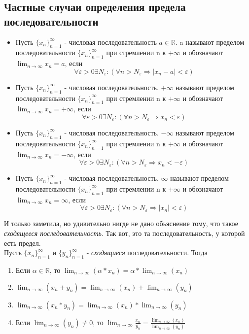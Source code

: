 \documentclass[10pt, a4paper,twocolumn]{article}
\begin{document}
\subsection{Частные случаи определения предела последовательности}
\begin{itemize}
    \item Пусть $\{x_{n}\}^{\infty}_{n = 1}$ - числовая последовательность $a \in \mathbb{R}$. a называют пределом последовательности $\{x_{n}\}^{\infty}_{n = 1}$ при стремлении n к $+ \infty$ и обозначают $\lim_{n \to \infty} x_{n} = a$, если $$\forall \varepsilon > 0 \exists N_{\varepsilon} : (\forall n > N_{\varepsilon} \Rightarrow |x_n - a| < \varepsilon)$$
    \item Пусть $\{x_{n}\}^{\infty}_{n = 1}$ - числовая последовательность. $+ \infty$ называют пределом последовательности $\{x_{n}\}^{\infty}_{n = 1}$ при стремлении n к $+ \infty$ и обозначают $\lim_{n \to \infty} x_{n} = +\infty$, если $$\forall \varepsilon > 0 \exists N_{\varepsilon} : (\forall n > N_{\varepsilon} \Rightarrow x_n < \varepsilon)$$
    \item Пусть $\{x_{n}\}^{\infty}_{n = 1}$ - числовая последовательность. $- \infty$ называют пределом последовательности $\{x_{n}\}^{\infty}_{n = 1}$ при стремлении n к $+ \infty$ и обозначают $\lim_{n \to \infty} x_{n} = -\infty$, если $$\forall \varepsilon > 0 \exists N_{\varepsilon} : (\forall n > N_{\varepsilon} \Rightarrow x_n < - \varepsilon)$$
    \item Пусть $\{x_{n}\}^{\infty}_{n = 1}$ - числовая последовательность. $\infty$ называют пределом последовательности $\{x_{n}\}^{\infty}_{n = 1}$ при стремлении n к $+ \infty$ и обозначают $\lim_{n \to \infty} x_{n} = \infty$, если $$\forall \varepsilon > 0 \exists N_{\varepsilon} : (\forall n > N_{\varepsilon} \Rightarrow |x_n| < \varepsilon)$$
\end{itemize}
И только заметила, но удивительно нигде не дано обьяснение тому, что такое \textsl{сходящееся последовательность}. Так вот, это та последовательность, у которой есть предел. 
\\ Пусть $\{x_{n}\}^{\infty}_{n = 1}$ и $\{y_{n}\}^{\infty}_{n = 1}$ - \textsl{сходящиеся} последовательности. Тогда
\begin{enumerate}
    \item Если $\alpha \in \mathbb{R}$, то $\lim_{n \to \infty}(\alpha * x_n) = \alpha * \lim_{n \to \infty}(x_n)$
    \item $\lim_{n \to \infty}(x_n + y_n) = \lim_{n \to \infty}(x_n) + \lim_{n \to \infty}(y_n)$  
    \item $\lim_{n \to \infty}(x_n * y_n) = \lim_{n \to \infty}(x_n) * \lim_{n \to \infty}(y_n)$ 
    \item Если $\lim_{n \to \infty}(y_n) \neq 0$, то $\lim_{n \to \infty}\frac{x_n}{y_n} = \frac{\lim_{n \to \infty}(x_n)}{\lim_{n \to \infty}(y_n)}$
\end{enumerate}
\end{document}
